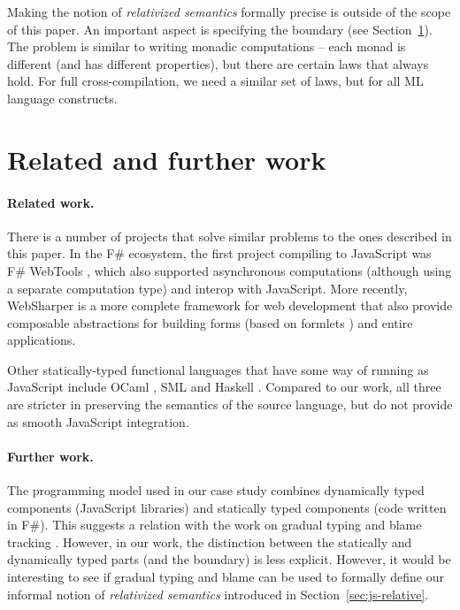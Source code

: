 \documentclass[submission,copyright,creativecommons]{eptcs}
\begin{document}
\noindent
Making the notion of \emph{relativized semantics} formally precise is outside of the scope
of this paper. An important aspect is specifying the boundary (see Section~\ref{sec:conc-interop}).
The problem is similar to writing monadic computations -- each monad is different (and has
different properties), but there are certain laws that always hold. For full cross-compilation,
we need a similar set of laws, but for all ML language constructs.


\section{Related and further work}
\label{sec:conc-interop}

\paragraph{Related work.}

There is a number of projects that solve similar problems to the ones described in this paper.
In the F\# ecosystem, the first project compiling to JavaScript was F\# WebTools \cite{fsharp-webtools},
which also supported asynchronous computations (although using a separate computation type)
and interop with JavaScript. More recently, WebSharper \cite{websharper-piglets,websharper-guis}
is a more complete framework for web development that also provide composable abstractions for
building forms (based on formlets \cite{links-formlets}) and entire applications.

Other statically-typed functional languages that have some way of running as JavaScript 
include OCaml \cite{js_ocmal}, SML \cite{js_sml} and Haskell \cite{haskell-ghcjs}. Compared to
our work, all three are stricter in preserving the semantics of the source language, but 
do not provide as smooth JavaScript integration.

\vspace{-1em}
\paragraph{Further work.}
The programming model used in our case study combines dynamically typed components (JavaScript
libraries) and statically typed components (code written in F\#). This suggests a relation with
the work on gradual typing \cite{gradual-typing} and blame tracking \cite{blame-well}. However,
in our work, the distinction between the statically and dynamically typed parts (and the boundary) 
is less explicit. However, it would be interesting to see if gradual typing and blame can be
used to formally define our informal notion of \emph{relativized semantics} introduced in 
Section~\ref{sec:js-relative}.
\end{document}
